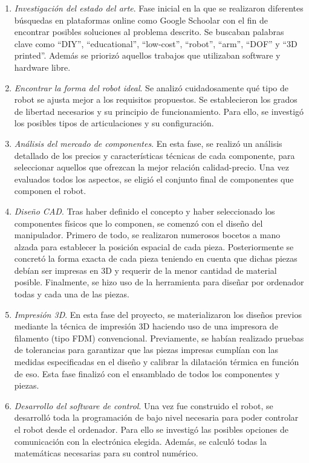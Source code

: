 \begin{enumerate}
\item \textit{Investigación del estado del arte}. Fase inicial en la que se realizaron diferentes
búsquedas en plataformas online como Google Schoolar con el fin de encontrar posibles soluciones al problema descrito. Se buscaban 
palabras clave como ``DIY'', ``educational'', ``low-cost'', ``robot'', ``arm'', ``DOF'' y ``3D printed''. Además se priorizó aquellos trabajos que utilizaban  
software y hardware libre. 
\item \textit{Encontrar la forma del robot ideal}. Se analizó cuidadosamente qué tipo de robot se ajusta mejor a los requisitos propuestos. Se establecieron los 
grados de libertad necesarios y su principio de funcionamiento. Para ello, se investigó los posibles tipos de articulaciones y 
su configuración.

\item \textit{Análisis del mercado de componentes}. En esta fase, se realizó un análisis detallado de los precios y características 
técnicas de cada componente, para seleccionar aquellos que ofrezcan la mejor relación calidad-precio. Una vez evaluados todos los 
aspectos, se eligió el conjunto final de componentes que componen el robot.
\newpage
\item \textit{Diseño CAD}. Tras haber definido el concepto y haber seleccionado los componentes físicos que lo componen, se comenzó con 
el diseño del manipulador. Primero de todo, se realizaron numerosos bocetos a mano alzada para establecer la posición espacial de cada 
pieza. Posteriormente se concretó la forma exacta de cada pieza teniendo en cuenta que dichas piezas debían ser impresas en 3D y requerir 
de la menor cantidad de material posible. Finalmente, se hizo uso de la herramienta  para diseñar por ordenador 
todas y cada una de las piezas.

\item \textit{Impresión 3D}. En esta fase del proyecto, se materializaron los diseños previos mediante la técnica de impresión 3D haciendo 
uso de una impresora de filamento (tipo \acs{FDM}) convencional. Previamente, se habían realizado pruebas de tolerancias para garantizar 
que las piezas impresas cumplían con las medidas especificadas en el diseño y calibrar la dilatación térmica en función de eso. Esta fase 
finalizó con el ensamblado de todos los componentes y piezas.

\item \textit{Desarrollo del software de control}. Una vez fue construido el robot, se desarrolló toda la programación de bajo nivel 
necesaria para poder controlar el robot desde el ordenador. Para ello se investigó las posibles opciones de comunicación con la electrónica elegida. Además,  
se calculó todas la matemáticas necesarias para su control numérico.


\end{enumerate}
